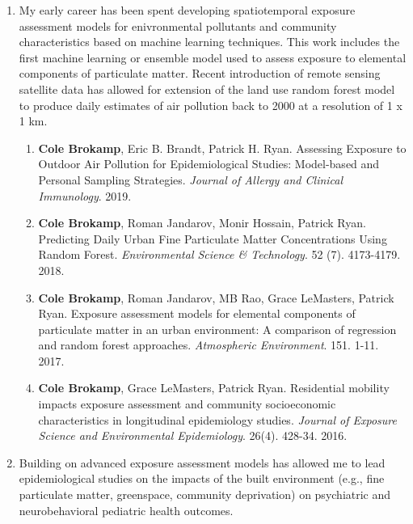 \documentclass{nihbiosketch}
\begin{document}
\begin{enumerate}

\item My early career has been spent developing spatiotemporal exposure assessment models for
  enivronmental pollutants and community characteristics based on machine learning
  techniques.  This work includes the first machine
  learning or ensemble model used to assess exposure to elemental components of
  particulate matter. Recent introduction of remote sensing satellite data has
  allowed for extension of the land use random forest model to produce daily
  estimates of air pollution back to 2000 at a resolution of 1 x 1 km.

\begin{enumerate}
	
  \item \textbf{Cole Brokamp}, Eric B. Brandt, Patrick H. Ryan. Assessing
  Exposure to Outdoor Air Pollution for Epidemiological Studies:
  Model-based and Personal Sampling Strategies. \emph{Journal of Allergy
    and Clinical Immunology}. 2019.

  \item \textbf{Cole Brokamp}, Roman Jandarov, Monir Hossain, Patrick Ryan. Predicting Daily Urban Fine Particulate Matter Concentrations Using Random Forest. \textit{Environmental Science \& Technology}. 52 (7). 4173-4179. 2018.

  \item \textbf{Cole Brokamp}, Roman Jandarov, MB Rao, Grace LeMasters, Patrick Ryan. Exposure assessment models for elemental components of particulate matter in an urban environment: A comparison of regression and random forest approaches. \textit{Atmospheric Environment}. 151. 1-11. 2017.
	
  \item \textbf{Cole Brokamp}, Grace LeMasters, Patrick Ryan. Residential
    mobility impacts exposure assessment and community socioeconomic
    characteristics in longitudinal epidemiology studies. \emph{Journal of
      Exposure Science and Environmental Epidemiology}. 26(4). 428-34. 2016.

\end{enumerate}

\item Building on advanced exposure assessment models has allowed me to lead epidemiological studies on the impacts of the built environment (e.g., fine particulate matter, greenspace, community deprivation) on psychiatric and  neurobehavioral pediatric health outcomes.


\end{enumerate}
\end{document}
